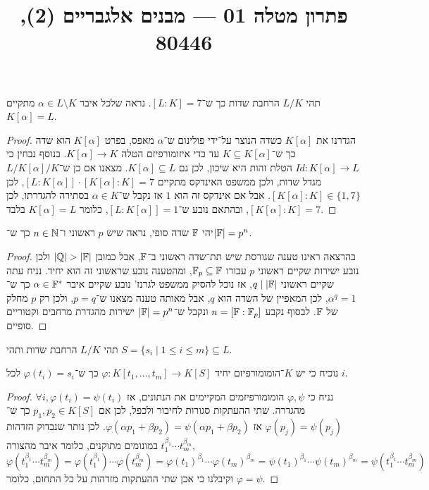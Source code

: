 
\title{פתרון מטלה 01 --- מבנים אלגבריים (2), 80446}


\maketitle
\maketitleprint{}

\question{}
תהי $L / K$ הרחבת שדות כך ש־$[L : K] = 7$.
נראה שלכל איבר $\alpha \in L \setminus K$ מתקיים $K[\alpha] = L$.
\begin{proof}
	הגדרנו את $K[\alpha]$ כשדה הנוצר על־ידי פולינום ש־$\alpha$ מאפס, בפרט $K[\alpha]$ הוא שדה כך ש־$K \subseteq K[\alpha]$ עד כדי איזומורפיזם הטלה $K[\alpha] \to K$.
	בנוסף נבחין כי $Id : K[\alpha] \to L$ הטלת זהות היא שיכון, לכן גם $K[\alpha] \subseteq L$.
	מצאנו אם כן ש־$L / K[\alpha] / K$ מגדל שדות, ולכן ממשפט האינדקס מתקיים $[L : K[\alpha]] \cdot [K[\alpha] : K] = 7$, לכן $[K[\alpha] : K] \in \{1, 7\}$.
	אבל אם אינדקס זה הוא $1$ אז נקבל ש־$\alpha \in K$ בסתירה להגדרתו, לכן $[K[\alpha] : K] = 7$, ובהתאם נובע ש־$[L : K[\alpha]] = 1$, כלומר $K[\alpha] = L$ בלבד.
\end{proof}

\question{}
יהי $\mathbb{F}$ שדה סופי,
נראה שיש $p$ ראשוני ו־$n \in \mathbb{N}$ כך ש־$|\mathbb{F}| = p^n$.
\begin{proof}
	בהרצאה ראינו טענה שגורסת שיש תת־שדה ראשוני ב־$\mathbb{F}$, אבל כמובן $|\mathbb{Q}| > |\mathbb{F}|$ ולכן נובע ישירות שקיים ראשוני $p$ עבורו $\mathbb{F}_p \subseteq \mathbb{F}$, ומהטענה נובע שראשוני זה הוא יחיד.
	נניח עתה שקיים ראשוני $q \mid |\mathbb{F}|$, אז נוכל להסיק ממשפט לגרנז' נובע שקיים איבר $\alpha \in \mathbb{F}^*$ כך ש־$\alpha^q = 1$, לכן המאפיין של השדה הוא $q$, אבל מאותה טענה מצאנו ש־$p = q$, ולכן רק $p$ מחלק של $\mathbb{F}$.
	לבסוף נקבע $n = [\mathbb{F} : \mathbb{F}_p]$ ונקבל ש־$|\mathbb{F}| = p^n$ ישירות מהגדרת מרחבים וקטוריים סופיים.
\end{proof}

\question{}
תהי $L / K$ הרחבת שדות ותהי $S = \{ s_i \mid 1 \le i \le m \} \subseteq L$.

\subquestion{}
נוכיח כי יש $K$־הומומורפיזם יחיד $\varphi : K[t_1, \dots, t_m] \to K[S]$ כך ש־$\varphi(t_i) = s_i$ לכל $i$.
\begin{proof}
	נניח כי $\varphi, \psi$ הומומורפיזמים המקיימים את הנתונים, אז $\forall i, \varphi(t_i) = \psi(t_i)$ מהגדרה.
	שתי ההעתקות סגורות לחיבור ולכפל, לכן אם $p_1, p_2 \in K[S]$ כך ש־$\varphi(p_j) = \psi(p_j)$ אז $\varphi(\alpha p_1 + \beta p_2) = \psi(\alpha p_1 + \beta p_2)$.
	לכן נותר שנבדוק הזדהות במונומים מתוקנים, כלומר איבר מהצורה $t_1^{\beta_1} \cdots t_m^{\beta_m}$,
	\[
		\varphi(t_1^{\beta_1} \cdots t_m^{\beta_m})
		= \varphi(t_1^{\beta_1}) \cdots \varphi(t_m^{\beta_m})
		= {\varphi(t_1)}^{\beta_1} \cdots {\varphi(t_m)}^{\beta_m}
		= {\psi(t_1)}^{\beta_1} \cdots {\psi(t_m)}^{\beta_m}
		= \psi(t_1^{\beta_1} \cdots t_m^{\beta_m})
	\]
	וקיבלנו כי אכן שתי ההעתקות מזדהות על כל התחום, כלומר $\varphi = \psi$.
\end{proof}

